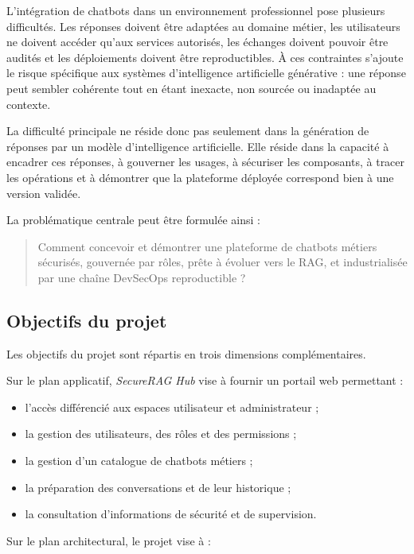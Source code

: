 L'intégration de chatbots dans un environnement professionnel pose plusieurs difficultés. Les réponses doivent être adaptées au domaine métier, les utilisateurs ne doivent accéder qu'aux services autorisés, les échanges doivent pouvoir être audités et les déploiements doivent être reproductibles. À ces contraintes s'ajoute le risque spécifique aux systèmes d'intelligence artificielle générative : une réponse peut sembler cohérente tout en étant inexacte, non sourcée ou inadaptée au contexte.

La difficulté principale ne réside donc pas seulement dans la génération de réponses par un modèle d'intelligence artificielle. Elle réside dans la capacité à encadrer ces réponses, à gouverner les usages, à sécuriser les composants, à tracer les opérations et à démontrer que la plateforme déployée correspond bien à une version validée.

La problématique centrale peut être formulée ainsi :

\begin{quote}
Comment concevoir et démontrer une plateforme de chatbots métiers sécurisés, gouvernée par rôles, prête à évoluer vers le RAG, et industrialisée par une chaîne DevSecOps reproductible ?
\end{quote}

\subsection{Objectifs du projet}

Les objectifs du projet sont répartis en trois dimensions complémentaires.

Sur le plan applicatif, \textit{SecureRAG Hub} vise à fournir un portail web permettant :

\begin{itemize}
    \item l'accès différencié aux espaces utilisateur et administrateur ;
    \item la gestion des utilisateurs, des rôles et des permissions ;
    \item la gestion d'un catalogue de chatbots métiers ;
    \item la préparation des conversations et de leur historique ;
    \item la consultation d'informations de sécurité et de supervision.
\end{itemize}

Sur le plan architectural, le projet vise à :

